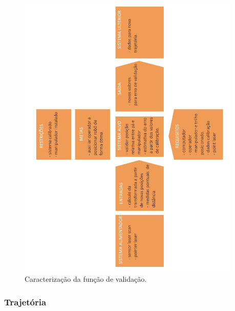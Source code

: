 \documentclass[12pt,a4paper]{article}
\begin{document}
\begin{figure}[H]
\begin{center}
  \includegraphics[width=0.95\textwidth]{figs/caracterizacao_validacao.jpg}
  \caption{Caracterização da função de validação.}
  \label{fig:caracterizacao_validacao}
\end{center}
\end{figure} 

\subsubsection {Trajetória}
\end{document}
